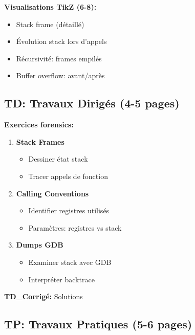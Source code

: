 \documentclass[10pt,a4paper]{article}
\begin{document}
\textbf{Visualisations TikZ (6-8):}
\begin{itemize}
\item Stack frame (détaillé)
\item Évolution stack lors d'appels
\item Récursivité: frames empilés
\item Buffer overflow: avant/après
\end{itemize}

\subsection*{TD: Travaux Dirigés (4-5 pages)}

\textbf{Exercices forensics:}
\begin{enumerate}
\item \textbf{Stack Frames}
   \begin{itemize}
   \item Dessiner état stack
   \item Tracer appels de fonction
   \end{itemize}

\item \textbf{Calling Conventions}
   \begin{itemize}
   \item Identifier registres utilisés
   \item Paramètres: registres vs stack
   \end{itemize}

\item \textbf{Dumps GDB}
   \begin{itemize}
   \item Examiner stack avec GDB
   \item Interpréter backtrace
   \end{itemize}
\end{enumerate}

\textbf{TD\_Corrigé:} Solutions

\subsection*{TP: Travaux Pratiques (5-6 pages)}
\end{document}

